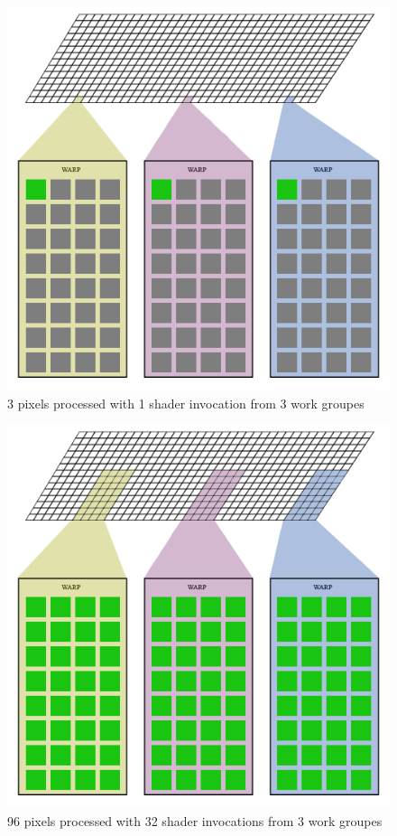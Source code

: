 \documentclass{article}
\begin{document}
\begin{figure}[h]
	\centering
	\includegraphics[scale=0.2]{figures/work_groupe_1.png}
	\caption{3 pixels processed with 1 shader invocation from 3 work groupes}
\end{figure}

\begin{figure}[h]
	\centering
	\includegraphics[scale=0.2]{figures/work_groupe_0.png}
	\caption{96 pixels processed with 32 shader invocations from 3 work groupes}
\end{figure}
\end{document}
